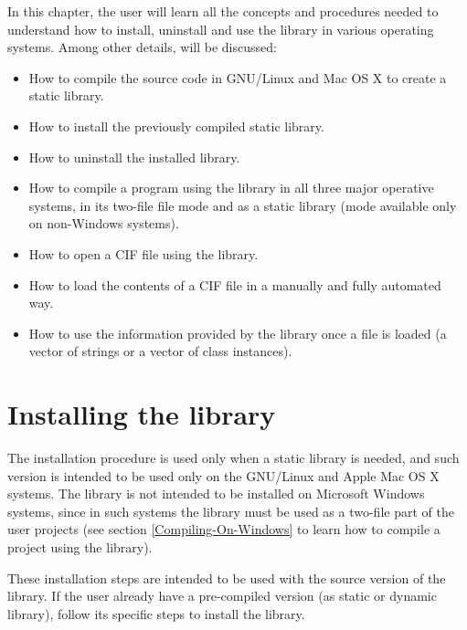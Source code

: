 \documentclass[11pt,twoside,openany,x11names,svgnames]{memoir}
\begin{document}
In this chapter, the user will learn all the concepts and procedures needed to understand how to install, uninstall and use the library in various operating systems. Among other details, will be discussed:

\begin{itemize}
	\item How to compile the source code in GNU/Linux and Mac OS X to create a static library.
	
	\item How to install the previously compiled static library.
	
	\item How to uninstall the installed library.
	
	\item How to compile a program using the library in all three major operative systems, in its two-file file mode and as a static library (mode available only on non-Windows systems).
	
	\item How to open a CIF file using the library.
	
	\item How to load the contents of a CIF file in a manually and fully automated way.
	
	\item How to use the information provided by the library once a file is loaded (a vector of strings or a vector of class instances).
\end{itemize}
\newpage 

\section{Installing the library}\label{Installing-The-Library}

The installation procedure is used only when a static library is needed, and such version is intended to be used only on the GNU/Linux and Apple Mac OS X systems. The library  is not intended to be installed on Microsoft Windows systems, since in such systems the library must be used as a two-file part of the user projects (see section \ref{Compiling-On-Windows} to learn how to compile a project using the library).

These installation steps are intended to be used with the source version of the library. If the user already have a pre-compiled version (as static or dynamic library), follow its specific steps to install the library.
\end{document}
